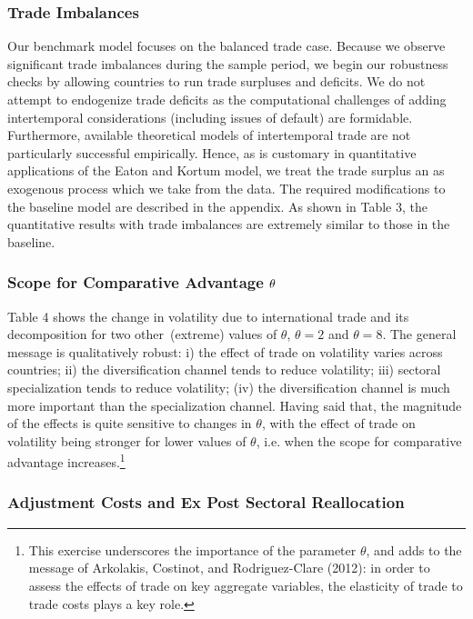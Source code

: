 \documentclass[12pt]{article}
\begin{document}
\subsubsection{Trade Imbalances}

Our benchmark model focuses on the balanced trade case. Because we observe
significant trade imbalances during the sample period, we begin our
robustness checks by allowing countries to run trade surpluses and deficits.
We do not attempt to endogenize trade deficits as the computational
challenges of adding intertemporal considerations (including issues of
default) are formidable. Furthermore, available theoretical models of
intertemporal trade are not particularly successful empirically. Hence, as
is customary in quantitative applications of the Eaton and Kortum model, we
treat the trade surplus an as exogenous process which we take from the data.
The required modifications to the baseline model are described in the
appendix. As shown in Table 3, the quantitative results with trade
imbalances are extremely similar to those in the baseline.

\subsubsection{Scope for Comparative Advantage $\protect\theta $}

Table 4 shows the change in volatility due to international trade and its
decomposition for two other\ (extreme) values of $\theta $, $\theta =2$ and $%
\theta =8.$ The general message is qualitatively robust: i) the effect of
trade on volatility varies across countries; ii) the diversification channel
tends to reduce volatility; iii) sectoral specialization tends to reduce
volatility; (iv) the diversification channel is much more important than the
specialization channel. Having said that, the magnitude of the effects is
quite sensitive to changes in $\theta $, with the effect of trade on
volatility being stronger for lower values of $\theta $, i.e. when the scope
for comparative advantage increases.\footnote{%
This exercise underscores the importance of the parameter $\theta $, and
adds to the message of Arkolakis, Costinot, and Rodriguez-Clare (2012): in
order to assess the effects of trade on key aggregate variables, the
elasticity of trade to trade costs plays a key role.}

\subsubsection{Adjustment Costs and Ex Post Sectoral Reallocation}
\end{document}

